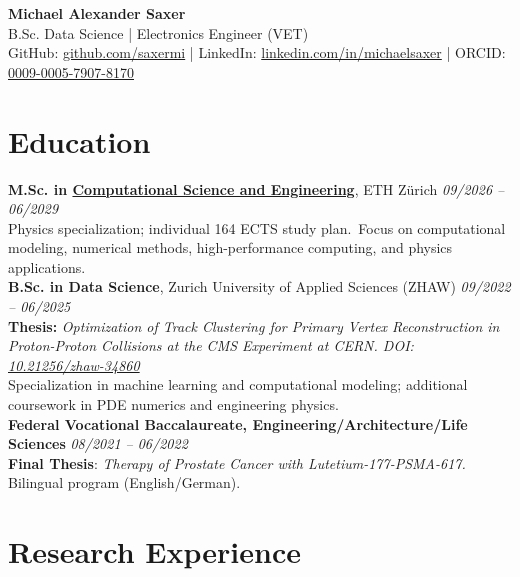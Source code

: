 \documentclass[a4paper,10pt]{article}
\begin{document}
\begin{center}
{\LARGE \textbf{Michael Alexander Saxer}}\\[4pt]
B.Sc. Data Science \quad | \quad Electronics Engineer (VET)\\[4pt]
GitHub: \href{https://github.com/saxermi}{github.com/saxermi} \quad | \quad
LinkedIn: \href{https://linkedin.com/in/michaelsaxer}{linkedin.com/in/michaelsaxer} \quad | \quad
ORCID: \href{https://orcid.org/0009-0005-7907-8170}{0009-0005-7907-8170}
\end{center}


\vspace{0.5em}

\section*{Education}
\textbf{M.Sc. in \href{https://ethz.ch/en/studies/master/degree-programmes/engineering-sciences/computational-science-and-engineering.html}{Computational Science and Engineering}}, ETH Zürich \hfill \textit{09/2026 – 06/2029}\\
Physics specialization; individual 164 ECTS study plan.\
Focus on computational modeling, numerical methods, high-performance computing, and physics applications.\\
\textbf{B.Sc. in Data Science}, Zurich University of Applied Sciences (ZHAW) \hfill \textit{09/2022 – 06/2025}\\
\textbf{Thesis:} \textit{Optimization of Track Clustering for Primary Vertex Reconstruction in Proton-Proton Collisions at the CMS Experiment at CERN. DOI: \href{https://doi.org/10.21256/zhaw-34860}{10.21256/zhaw-34860}}\\
Specialization in machine learning and computational modeling; additional coursework in PDE numerics and engineering physics.\\
\textbf{Federal Vocational Baccalaureate, Engineering/Architecture/Life Sciences} \hfill \textit{08/2021 – 06/2022}\\
\textbf{Final Thesis}: \textit{Therapy of Prostate Cancer with Lutetium-177-PSMA-617.}\\
Bilingual program (English/German).


\vspace{0.5em}

\section*{Research Experience}
\end{document}
